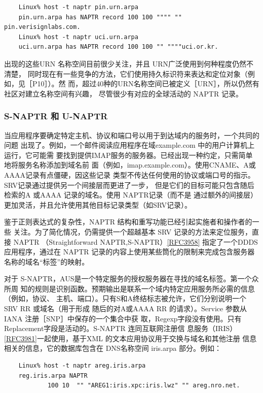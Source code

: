 \begin{verbatim}
    Linux% host -t naptr pin.urn.arpa
    pin.urn.arpa has NAPTR record 100 100 """" "" pin.verisignlabs.com.
    Linux% host -t naptr uci.urn.arpa
    uci.urn.arpa has NAPTR record 100 100 "" """"uci.or.kr.
\end{verbatim}

出现的这些URN 名称空间目前很少关注，并且 URN广泛使用到何种程度仍然不清楚，
同时现在有一些竞争的方法，它们使用持久标识符来表达和定位对象（例如，见［P10］）。然
而，超过40种的URN名称空间已被定义［URN］，所以仍然有社区对建立名称空间有兴趣，
尽管很少有对应的全球活动的 NAPTR 记录。

\subsubsection{S-NAPTR 和 U-NAPTR}

当应用程序要确定特定主机、协议和端口号以用于到达域内的服务时，一个共同的问题
出现了。例如，一个邮件阅读应用程序在域example.com 中的用户计算机上运行，它可能需
要找到提供IMAP服务的服务器。已经出现一种约定，只需简单地将服务名称添加到域名前
面（例如，imap.example.com）。使用CNAME、A或AAAA记录有点僵硬，因这些记录
类型不传达任何使用的协议或端口号的指示。SRV记录通过提供另一个间接层而更进了一步，
但是它们的目标可能只包含随后检索的A 或AAAA 记录的域名。使用 NAPTR记录（而不是
通过额外的间接层）更加灵活，并且允许使用其他目标记录类型（如SRV记录）。

鉴于正则表达式的复杂性，NAPTR 结构和重写功能已经引起实施者和操作者的一些
关注。为了简化情况，仍需提供一个超越基本 SRV 记录的方法来定位服务，直接 NAPTR
（Straightforward NAPTR,S-NAPTR）\href{https://www.rfc-editor.org/rfc/rfc3958}{[RFC3958]} 指定了一个DDDS应用程序，通过在
NAPTR 记录的内容上使用某些筒化的限制来完成包含服务器名称的域名“标签”的映射。

对于 S-NAPTR，AUS是一个特定服务的授权服务器在寻找的域名标签。第一个众所周
知的规则是识别函数。预期输出是联系一个域内特定应用服务所必需的信息（例如，协议、
主机、端口）。只有S和A终结标志被允许，它们分别说明一个 SRV RR 或域名（用于形成
随后的对A或AAAA RR 的请求）。Service 参数从IANA 注册［SNP］中保存的一个集合中获
取，Regexp字段没有使用。只有 Replacement字段是活动的。S-NAPTR 连同互联网注册信
息服务（IRIS）\href{https://www.rfc-editor.org/rfc/rfc3981}{[RFC3981]}一起使用，基于XML 的文本应用协议用于交换与域名和其他注册
信息相关的信息，它的数据库包含在 DNS名称空间 iris.arpa 部分。例如：
\begin{verbatim}
    Linux% host -t naptr areg.iris.arpa
    reg.iris.arpa NAPTR
            100 10  "" "AREG1:iris.xpc:iris.lwz" "" areg.nro.net.
\end{verbatim}


